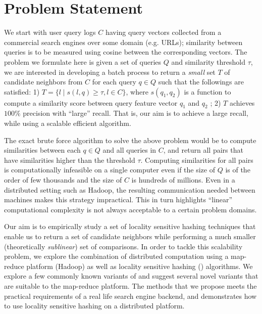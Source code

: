 \newcommand{\corpus}{$C$\xspace}

\section{Problem Statement}
We start with user query logs \corpus having query vectors collected from 
a commercial search engines over some domain (e.g. URLs); similarity between queries is to be measured using cosine between the corresponding
vectors. 
The problem we formulate here is given a set of queries $Q$ and similarity threshold $\tau$,
we are interested in developing a batch process to return a \emph{small}
set $T$ of candidate neighbors from \corpus for each query $q \in Q$ such that the followings
are satisfied: 1) $T = \{ l \mid s(l, q) \geq \tau,  l \in C  \}$, where  $s(q_1, q_2)$ is a function to
compute a similarity score between query feature vector $q_1$ and $q_2$
; 2) $T$ achieves $100\%$ precision with ``large'' recall. 
That is, our aim is to achieve a large recall, while using
a scalable efficient algorithm.

The exact brute force algorithm to solve the above problem would be to compute
similarities between each $q\in Q$ and all queries in \corpus, and return 
all pairs that have similarities higher than the threshold $\tau$. Computing similarities
for all pairs is computationally infeasible on a single computer even if the size of $Q$ is of the order of few thousands
and the size of \corpus is hundreds of millions. Even in a distributed setting such as Hadoop, the 
resulting communication needed between machines makes this strategy impractical.  This in turn highlights ``linear'' computational complexity is not always acceptable to a certain problem domains.

Our aim is to empirically study a set of locality sensitive hashing techniques
that enable us to return a set of candidate neighbors while performing
a much smaller (theoretically \emph{sublinear}) set of comparisons. 
In order to tackle this scalability problem, we explore the 
combination of distributed computation using a map-reduce platform (Hadoop) as well as
locality sensitive hashing (\lsh) algorithms. 
We explore a few commonly known variants of \lsh and suggest several novel variants
that are suitable to the map-reduce platform. 
The methods that we propose meets the practical requirements of a real life 
search engine backend, and demonstrates how to use locality sensitive hashing
on a distributed platform. 



